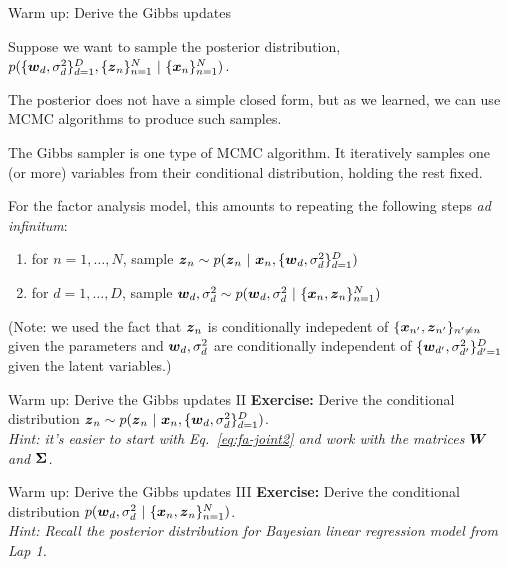 \documentclass[aspectratio=169]{beamer}
\begin{document}
\begin{frame}{Warm up: Derive the Gibbs updates}

Suppose we want to sample the posterior distribution, $p(\{\boldsymbol{w}_d, \sigma_d^2\}_{d=1}^D, \{\boldsymbol{z}_n\}_{n=1}^N ~\vert~ \{\boldsymbol{x}_n\}_{n=1}^N)$. 

The posterior does not have a simple closed form, but as we learned, we can use MCMC algorithms to produce such samples. 

The Gibbs sampler is one type of MCMC algorithm. It iteratively samples one (or more) variables from their conditional distribution, holding the rest fixed.

For the factor analysis model, this amounts to repeating the following steps \textit{ad infinitum}:
\begin{enumerate}
    \item for $n=1,\ldots,N$, sample $\boldsymbol{z}_n \sim p(\boldsymbol{z}_n ~\vert~ \boldsymbol{x}_n, \{\boldsymbol{w}_d, \sigma_d^2\}_{d=1}^D)$
    \item for $d=1,\ldots,D$, sample $\boldsymbol{w}_d, \sigma_d^2 \sim p(\boldsymbol{w}_d, \sigma_d^2 ~\vert~ \{\boldsymbol{x}_{n}, \boldsymbol{z}_n\}_{n=1}^N)$
\end{enumerate}
(Note: we used the fact that $\boldsymbol{z}_n$ is conditionally indepedent of $\{\boldsymbol{x}_{n'}, \boldsymbol{z}_{n'}\}_{n'\neq n}$ given the parameters and $\boldsymbol{w}_d, \sigma_d^2$ are conditionally independent of $\{\boldsymbol{w}_{d'}, \sigma_{d'}^2\}_{d'=1}^D$ given the latent variables.)

\end{frame}

\begin{frame}[t]{Warm up: Derive the Gibbs updates II}
\textbf{Exercise: } Derive the conditional distribution $\boldsymbol{z}_n \sim p(\boldsymbol{z}_n ~\vert~ \boldsymbol{x}_n, \{\boldsymbol{w}_d, \sigma_d^2\}_{d=1}^D)$. 
\\
\textit{Hint: it's easier to start with Eq.~\ref{eq:fa-joint2} and work with the matrices $\boldsymbol{W}$ and $\boldsymbol{\Sigma}$.}
\end{frame}

\begin{frame}[t]{Warm up: Derive the Gibbs updates III}
\textbf{Exercise: } Derive the conditional distribution $p(\boldsymbol{w}_d, \sigma_d^2 ~\vert~ \{\boldsymbol{x}_{n}, \boldsymbol{z}_n\}_{n=1}^N)$. \\
\textit{Hint: Recall the posterior distribution for Bayesian linear regression model from Lap 1.}
\end{frame}
\end{document}
